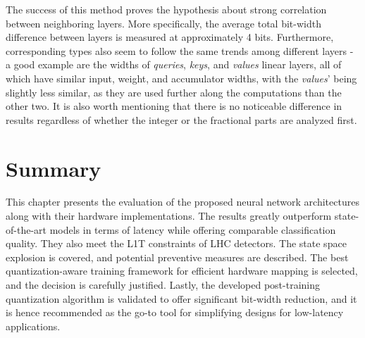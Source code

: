 The success of this method proves the hypothesis about strong correlation between neighboring layers. More specifically, the average total bit-width difference between layers is measured at approximately 4 bits. Furthermore, corresponding types also seem to follow the same trends among different layers - a good example are the widths of \textit{queries}, \textit{keys}, and \textit{values} linear layers, all of which have similar input, weight, and accumulator widths, with the \textit{values}' being slightly less similar, as they are used further along the computations than the other two. It is also worth mentioning that there is no noticeable difference in results regardless of whether the integer or the fractional parts are analyzed first.

\section{Summary}
This chapter presents the evaluation of the proposed neural network architectures along with their hardware implementations. The results greatly outperform state-of-the-art models in terms of latency while offering comparable classification quality. They also meet the L1T constraints of LHC detectors. The state space explosion is covered, and potential preventive measures are described. The best quantization-aware training framework for efficient hardware mapping is selected, and the decision is carefully justified. Lastly, the developed post-training quantization algorithm is validated to offer significant bit-width reduction, and it is hence recommended as the go-to tool for simplifying designs for low-latency applications.